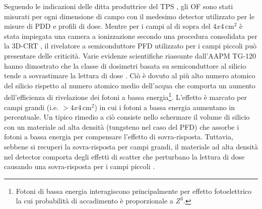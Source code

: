 Seguendo le indicazioni delle ditta produttrice del TPS \cite{RaySearchLaboratories2014}, gli OF sono stati misurati per ogni dimensione di campo con il medesimo detector utilizzato per le misure di PDD e profili di dose. Mentre per i campi al di sopra del $4x4\,$cm$^2$ è stata impiegata una camera a ionizzazione secondo una procedura consolidata per la 3D-CRT \cite{Andreo2006}, il rivelatore a semiconduttore PFD utilizzato per i campi piccoli può presentare delle criticità. Varie evidenze scientifiche riassunte dall'AAPM TG-120 \cite{Low2011} hanno dimostrato che la classe di dosimetri basata su semiconduttore al silicio tende a sovrastimare la lettura di dose \cite{Low2011}. Ciò è dovuto al più alto numero atomico del silicio rispetto al numero atomico medio dell'acqua che comporta un aumento dell'efficienza di rivelazione dei fotoni a bassa energia\footnote{Fotoni di bassa energia interagiscono principalmente per effetto fotoelettrico la cui probabilità di accadimento è proporzionale a $Z^3$.}. L'effetto è marcato per campi grandi (i.e. $> 4x4\,$cm$^2$) in cui i fotoni a bassa energia aumentano in percentuale. Un tipico rimedio a ciò consiste nello schermare il volume di silicio con un materiale ad alta densità (tungsteno nel caso del PFD) che assorbe i fotoni a bassa energia per compensare l'effetto di sovra-risposta. Tuttavia, sebbene si recuperi la sovra-risposta per campi grandi, il materiale ad alta densità nel detector comporta degli effetti di scatter che perturbano la lettura di dose causando una sovra-risposta per i campi piccoli \cite{Griessbach2005}.

